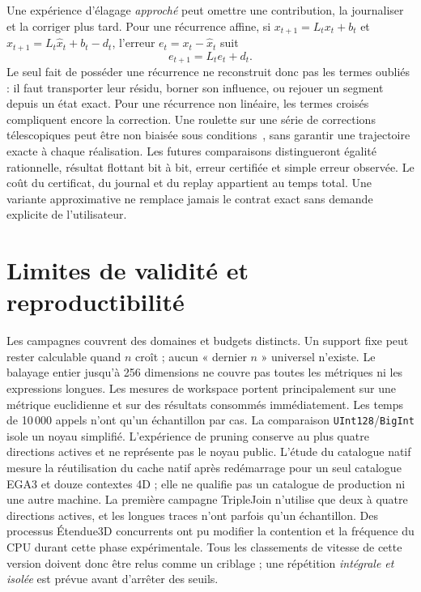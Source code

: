 \documentclass[11pt,a4paper]{article}
\newcommand{\code}[1]{\texttt{#1}}
\begin{document}
Une expérience d'élagage \emph{approché} peut omettre une contribution, la
journaliser et la corriger plus tard. Pour une récurrence affine, si
$x_{t+1}=L_tx_t+b_t$ et
$\widehat{x}_{t+1}=L_t\widehat{x}_t+b_t-d_t$, l'erreur
$e_t=x_t-\widehat{x}_t$ suit
\begin{equation}
e_{t+1}=L_t e_t+d_t.
\label{eq:recurrence}
\end{equation}
Le seul fait de posséder une récurrence ne reconstruit donc pas les termes
oubliés : il faut transporter leur résidu, borner son influence, ou rejouer un
segment depuis un état exact. Pour une récurrence non linéaire, les termes
croisés compliquent encore la correction. Une roulette sur une série de
corrections télescopiques peut être non biaisée sous conditions~\cite{rhee}, sans garantir une
trajectoire exacte à chaque réalisation. Les futures comparaisons distingueront
égalité rationnelle, résultat flottant bit à bit, erreur certifiée et simple
erreur observée. Le coût du certificat, du journal et du replay appartient au
temps total. Une variante approximative ne remplace jamais le contrat exact
sans demande explicite de l'utilisateur.

\section{Limites de validité et reproductibilité}
Les campagnes couvrent des domaines et budgets distincts. Un support fixe
peut rester calculable quand $n$ croît ; aucun « dernier $n$ » universel
n'existe. Le balayage entier jusqu'à 256 dimensions ne couvre pas toutes les
métriques ni les expressions longues. Les mesures de workspace portent
principalement sur une métrique euclidienne et sur des résultats consommés
immédiatement. Les temps de 10\,000 appels n'ont qu'un échantillon par cas.
La comparaison \code{UInt128}/\code{BigInt} isole un noyau simplifié.
L'expérience de pruning conserve au plus quatre directions actives et ne
représente pas le noyau public. L'étude du catalogue natif mesure la réutilisation du
cache natif après redémarrage pour un seul catalogue EGA3 et douze contextes
4D ; elle ne qualifie pas un catalogue de production ni une autre machine.
La première campagne TripleJoin n'utilise que deux à quatre directions actives,
et les longues traces n'ont parfois qu'un échantillon. Des processus
Étendue3D concurrents ont pu modifier la contention et la fréquence du CPU
durant cette phase expérimentale. Tous les classements de vitesse de cette
version doivent donc être relus comme un criblage ; une répétition
\emph{intégrale et isolée} est prévue avant d'arrêter des seuils.
\end{document}
